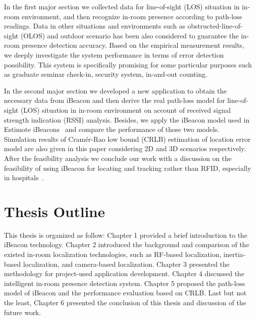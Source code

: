 \documentclass[12pt]{report}
\begin{document}
In the first major section we collected data for line-of-sight (LOS) situation in in-room environment, and then recognize in-room presence according to path-loss readings. Data in other situations and environments such as obstructed-line-of-sight (OLOS) and outdoor scenario has been also considered to guarantee the in-room presence detection accuracy. Based on the empirical measurement results, we deeply investigate the system performance in terms of error detection possibility. This system is specifically promising for some particular purposes such as graduate seminar check-in, security system, in-and-out counting.

In the second major section we developed a new application to obtain the necessary data from iBeacon and then derive the real path-loss model for line-of-sight (LOS) situation in in-room environment on account of received signal strength indication (RSSI) analysis. Besides, we apply the iBeacon model used in Estimote iBeacons~\cite{estlink} and compare the performance of those two models. Simulation results of Cramér-Rao low bound (CRLB) estimation of location error model are also given in this paper considering 2D and 3D scenarios respectively. After the feasibility analysis we conclude our work with a discussion on the feasibility of using iBeacon for locating and tracking rather than RFID, especially in hospitals~\cite{che}.

\section{Thesis Outline}
This thesis is organized as follow: Chapter 1 provided a brief introduction to the iBeacon technology. Chapter 2 introduced the background and comparison of the existed in-room localization technologies, such as RF-based localization, inertia-based localization, and camera-based localization. Chapter 3 presented the methodology for project-used application development. Chapter 4 discussed the intelligent in-room presence detection system. Chapter 5 proposed the path-loss model of iBeacon and the performance evaluation based on CRLB. Last but not the least, Chapter 6 presented the conclusion of this thesis and discussion of the future work. 

\end{document}
